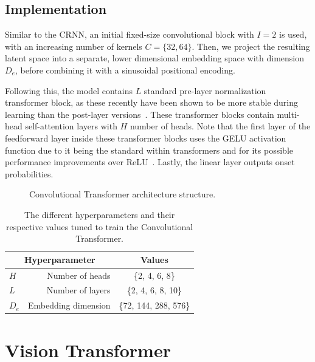 \subsection{Implementation}

Similar to the \gls{CRNN}, an initial fixed-size convolutional block with $I = 2$ is used, with an increasing number of kernels $C = \{32, 64\}$. Then, we project the resulting latent space into a separate, lower dimensional embedding space with dimension $D_e$, before combining it with a sinusoidal positional encoding. 

Following this, the model contains $L$ standard pre-layer normalization transformer block, as these recently have been shown to be more stable during learning than the post-layer versions~\cite{pmlr-v119-xiong20b}. These transformer blocks contain multi-head self-attention layers with $H$ number of heads. Note that the first layer of the feedforward layer inside these transformer blocks uses the \gls{GELU} activation function due to it being the standard within transformers and for its possible performance improvements over \gls{ReLU}~\cite{devlin-etal-2019-bert, hendrycks2023gaussianerrorlinearunits}. Lastly, the linear layer outputs onset probabilities.

\begin{figure}[H]
    \centering
    
    \caption{Convolutional Transformer architecture structure.}
    \label{CTFigure}
\end{figure}

\begin{table}[H]
    \centering
    \begin{tabular}{lr|c}
        \multicolumn{2}{c|}{Hyperparameter} & Values       \\
        \hline
        $H$ & Number of heads     & \{2, 4, 6, 8\} \\
        $L$ & Number of layers      & \{2, 4, 6, 8, 10\} \\
        $D_e$ & Embedding dimension      & \{72, 144, 288, 576\} \\
    \end{tabular}
    \caption{The different hyperparameters and their respective values tuned to train the Convolutional Transformer.}
    \label{CTHyperparams}
\end{table}

\section{Vision Transformer}

